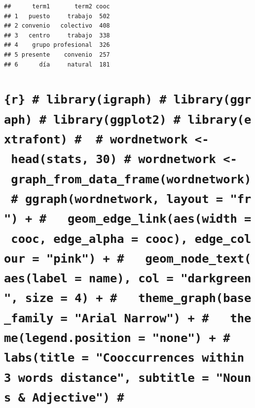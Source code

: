 \documentclass[]{article}
\begin{document}
\begin{verbatim}
##      term1       term2 cooc
## 1   puesto     trabajo  502
## 2 convenio   colectivo  408
## 3   centro     trabajo  338
## 4    grupo profesional  326
## 5 presente    convenio  257
## 6      día     natural  181
\end{verbatim}

\hypertarget{r-libraryigraph-libraryggraph-libraryggplot2-libraryextrafont-wordnetwork---headstats-30-wordnetwork---graph_from_data_framewordnetwork-ggraphwordnetwork-layout-fr-geom_edge_linkaeswidth-cooc-edge_alpha-cooc-edge_colour-pink-geom_node_textaeslabel-name-col-darkgreen-size-4-theme_graphbase_family-arial-narrow-themelegend.position-none-labstitle-cooccurrences-within-3-words-distance-subtitle-nouns-adjective}{%
\section{\texorpdfstring{\texttt{\{r\}\ \#\ library(igraph)\ \#\ library(ggraph)\ \#\ library(ggplot2)\ \#\ library(extrafont)\ \#\ \ \#\ wordnetwork\ \textless{}-\ head(stats,\ 30)\ \#\ wordnetwork\ \textless{}-\ graph\_from\_data\_frame(wordnetwork)\ \#\ ggraph(wordnetwork,\ layout\ =\ "fr")\ +\ \#\ \ \ geom\_edge\_link(aes(width\ =\ cooc,\ edge\_alpha\ =\ cooc),\ edge\_colour\ =\ "pink")\ +\ \#\ \ \ geom\_node\_text(aes(label\ =\ name),\ col\ =\ "darkgreen",\ size\ =\ 4)\ +\ \#\ \ \ theme\_graph(base\_family\ =\ "Arial\ Narrow")\ +\ \#\ \ \ theme(legend.position\ =\ "none")\ +\ \#\ \ \ labs(title\ =\ "Cooccurrences\ within\ 3\ words\ distance",\ subtitle\ =\ "Nouns\ \&\ Adjective")\ \#}}{\{r\} \# library(igraph) \# library(ggraph) \# library(ggplot2) \# library(extrafont) \#  \# wordnetwork \textless{}- head(stats, 30) \# wordnetwork \textless{}- graph\_from\_data\_frame(wordnetwork) \# ggraph(wordnetwork, layout = "fr") + \#   geom\_edge\_link(aes(width = cooc, edge\_alpha = cooc), edge\_colour = "pink") + \#   geom\_node\_text(aes(label = name), col = "darkgreen", size = 4) + \#   theme\_graph(base\_family = "Arial Narrow") + \#   theme(legend.position = "none") + \#   labs(title = "Cooccurrences within 3 words distance", subtitle = "Nouns \& Adjective") \#}}\label{r-libraryigraph-libraryggraph-libraryggplot2-libraryextrafont-wordnetwork---headstats-30-wordnetwork---graph_from_data_framewordnetwork-ggraphwordnetwork-layout-fr-geom_edge_linkaeswidth-cooc-edge_alpha-cooc-edge_colour-pink-geom_node_textaeslabel-name-col-darkgreen-size-4-theme_graphbase_family-arial-narrow-themelegend.position-none-labstitle-cooccurrences-within-3-words-distance-subtitle-nouns-adjective}}
\end{document}
